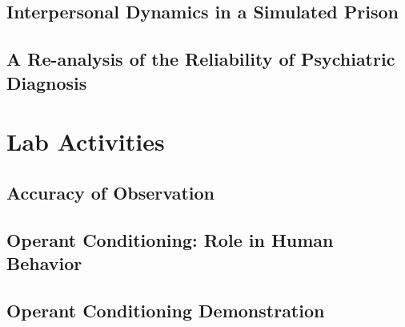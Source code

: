 \begin{refsection}
\begin{appendices}
\label{paper: rosenhan}


\subsection{Interpersonal Dynamics in a Simulated Prison}
\label{interpersonaldynamicsinasimulatedprison}

\label{paper: zimbardo}


\subsection{A Re-analysis of the Reliability of Psychiatric Diagnosis}
\label{are-analysisofthereliabilityofpsychiatricdiagnosis}

\label{paper: spitzer}


\section{Lab Activities}
\label{labactivities}

\subsection{Accuracy of Observation}
\label{accuracyofobservation}

\label{app: observation}


\subsection{Operant Conditioning: Role in Human Behavior}
\label{operantconditioning:roleinhumanbehavior}

\label{app: operantconditioning-humans}


\subsection{Operant Conditioning Demonstration}
\label{operantconditioningdemonstration}

\label{app: operantconditioning}



\end{appendices}
\end{refsection}
